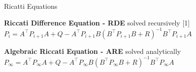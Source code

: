 
\begin{sstTitleBox}[ForestGreen]{{
				Ricatti Equations
			}
	}
	\begin{sstOnlyFrame}[ForestGreen]
		{\textbf{Riccati Difference Equation - RDE} solved recursively}
		\scalebox{0.97}[1]{$
				\scriptstyle
				P_i = A^\top P_{i+1} A
				+ Q - A^\top P_{i+1} B
				(B^\top P_{i+1} B + R)^{-1}
				B^\top P_{i+1} A$}
	\end{sstOnlyFrame}
	\begin{sstOnlyFrame}[ForestGreen]
		{\textbf{Algebraic Riccati Equation - ARE} solved analytically}
		{\center$\scriptstyle
				P_\infty = A^\top P_\infty A
				+ Q - A^\top P_\infty B
				(B^\top P_\infty B + R)^{-1}
				B^\top P_\infty A$}
	\end{sstOnlyFrame}
\end{sstTitleBox}
